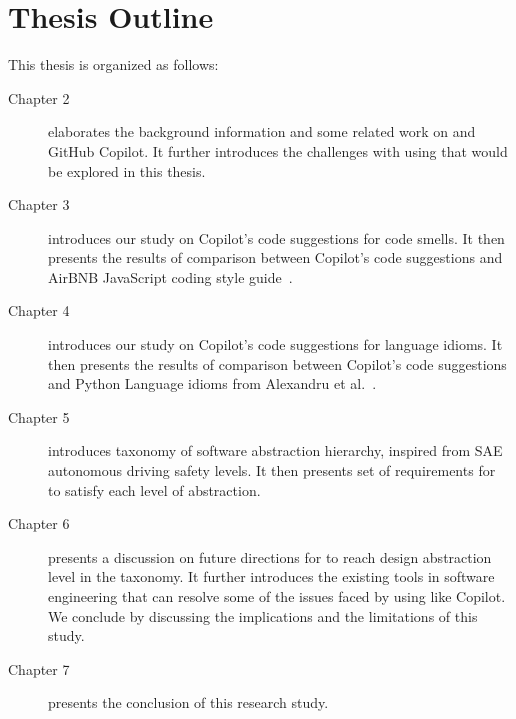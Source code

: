 \section{Thesis Outline}

This thesis is organized as follows:

\begin{description}
\item[Chapter 2] elaborates the background information and some related work on \cct{} and GitHub Copilot. It further introduces the challenges with using \cct{} that would be explored in this thesis.
\item[Chapter 3] introduces our study on Copilot's code suggestions for code smells. It then presents the results of comparison between Copilot's code suggestions and AirBNB JavaScript coding style guide~\cite{airbnb_code}.
\item[Chapter 4] introduces our study on Copilot's code suggestions for language idioms. It then presents the results of comparison between Copilot's code suggestions and Python Language idioms from Alexandru et al.~\cite{Alexandru2018}.
\item[Chapter 5] introduces taxonomy of software abstraction hierarchy, inspired from SAE autonomous driving safety levels. It then presents set of requirements for \cct{} to satisfy each level of abstraction.
\item[Chapter 6] presents a discussion on future directions for \cct{} to reach design abstraction level in the taxonomy. It further introduces the existing tools in software engineering that can resolve some of the issues faced by using \cct{} like Copilot. We conclude by discussing the implications and the limitations of this study.
\item[Chapter 7] presents the conclusion of this research study.
\end{description}


